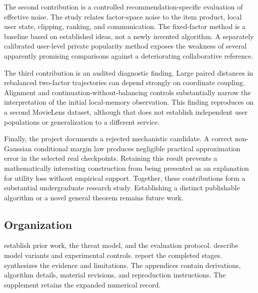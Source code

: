 The second contribution is a controlled recommendation-specific evaluation of
effective noise. The study relates factor-space noise to the item product, local
user state, clipping, ranking, and communication. The fixed-factor method is a
baseline based on established ideas, not a newly invented algorithm. A separately
calibrated user-level private popularity method exposes the weakness of several
apparently promising comparisons against a deteriorating collaborative reference.

The third contribution is an audited diagnostic finding. Large paired distances
in rebalanced two-factor trajectories can depend strongly on coordinate coupling.
Alignment and continuation-without-balancing controls substantially narrow the
interpretation of the initial local-memory observation. This finding reproduces
on a second MovieLens dataset, although that does not establish independent user
populations or generalization to a different service.

Finally, the project documents a rejected mechanistic candidate. A correct
non-Gaussian conditional margin law produces negligible practical approximation
error in the selected real checkpoints. Retaining this result prevents a
mathematically interesting construction from being presented as an explanation
for utility loss without empirical support. Together, these contributions form
a substantial undergraduate research study. Establishing a distinct publishable
algorithm or a novel general theorem remains future work.

\subsection{Organization}
 establish prior work, the threat model, and
the evaluation protocol.  describe model variants and
experimental controls.  report the
completed stages.  synthesizes the evidence and limitations.
The appendices contain derivations, algorithm details, material revisions, and
reproduction instructions. The supplement retains the expanded numerical record.
